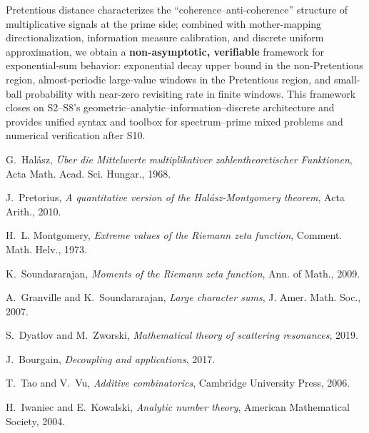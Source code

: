 \documentclass[11pt,a4paper]{article}
\theoremstyle{remark}
\begin{document}
Pretentious distance characterizes the ``coherence--anti-coherence'' structure of multiplicative signals at the prime side; combined with mother-mapping directionalization, information measure calibration, and discrete uniform approximation, we obtain a \textbf{non-asymptotic, verifiable} framework for exponential-sum behavior: exponential decay upper bound in the non-Pretentious region, almost-periodic large-value windows in the Pretentious region, and small-ball probability with near-zero revisiting rate in finite windows. This framework closes on S2--S8's geometric--analytic--information--discrete architecture and provides unified syntax and toolbox for spectrum--prime mixed problems and numerical verification after S10.

\begin{thebibliography}{9}

G.~Hal\'asz, \emph{\"{U}ber die Mittelwerte multiplikativer zahlentheoretischer Funktionen}, Acta Math. Acad. Sci. Hungar., 1968.

J.~Pretorius, \emph{A quantitative version of the Hal\'asz-Montgomery theorem}, Acta Arith., 2010.

H.~L. Montgomery, \emph{Extreme values of the Riemann zeta function}, Comment. Math. Helv., 1973.

K.~Soundararajan, \emph{Moments of the Riemann zeta function}, Ann. of Math., 2009.

A.~Granville and K.~Soundararajan, \emph{Large character sums}, J. Amer. Math. Soc., 2007.

S.~Dyatlov and M.~Zworski, \emph{Mathematical theory of scattering resonances}, 2019.

J.~Bourgain, \emph{Decoupling and applications}, 2017.

T.~Tao and V.~Vu, \emph{Additive combinatorics}, Cambridge University Press, 2006.

H.~Iwaniec and E.~Kowalski, \emph{Analytic number theory}, American Mathematical Society, 2004.

\end{thebibliography}
\end{document}
